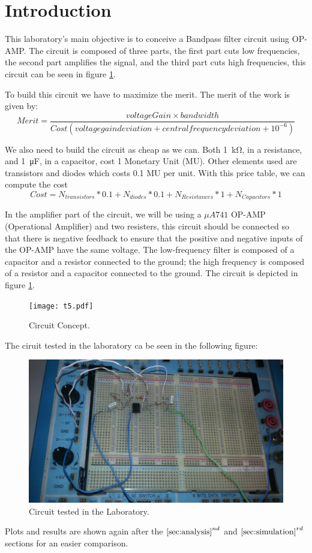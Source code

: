 \section{Introduction}

This laboratory's main objective is to conceive a Bandpass filter circuit using OP-AMP. The circuit is composed of three parts, the first part cuts low frequencies, the second part amplifies the signal, and the third part cuts high frequencies, this circuit can be seen in figure \ref{Fig1: circuit}.

To build this circuit we have to maximize the merit. The merit of the work is given by:
\begin{equation}
    Merit = \dfrac{voltageGain \times bandwidth}{Cost (voltage gain deviation + central frequency deviation + 10^{-6})}
\end{equation}

We also need to build the circuit as cheap as we can. Both \SI{1}{\kilo\ohm}, in a resistance, and \SI{1}{\micro\farad}, in a capacitor, cost 1 Monetary Unit (MU). Other elements used are transistors and diodes which costs 0.1 MU per unit.
With this price table, we can compute the cost
\begin{equation}
    Cost = N_{transistors}*0.1+N_{diodes}*0.1+N_{Resistances}*1+N_{Capacitors}*1
\end{equation}

In the amplifier part of the circuit, we will be using a $\mu A741$ OP-AMP (Operational Amplifier) and two resisters, this circuit should be connected so that there is negative feedback to ensure that the positive and negative inputs of the OP-AMP have the same voltage. The low-frequency filter is composed of a capacitor and a resistor connected to the ground; the high frequency is composed of a resistor and a capacitor connected to the ground. The circuit is depicted in figure \ref{Fig1: circuit}.

\begin{figure}[h] 
\centering
\texttt{[image: t5.pdf]}
\caption{Circuit Concept.}
\label{Fig1: circuit}
\end{figure}

The ciruit tested in the laboratory ca be seen in the following figure:

\begin{figure}[h] 
\centering
\includegraphics[width=0.6\linewidth]{Lab_Circuit.jpeg}
\caption{Circuit tested in the Laboratory.}
\label{Fig1.1: labcircuit}
\end{figure}

Plots and results are shown again after the $\ref{sec:analysis}^{nd}$ and $\ref{sec:simulation}^{rd}$ sections for an easier comparison.

